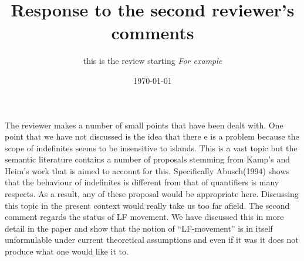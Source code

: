 \documentclass[11pt]{article}
\begin{document}
\title{Response to the second reviewer's comments}
\author{this is the review starting \textit{For example}}
\date{\today}

\maketitle
  The reviewer makes a number of small points that have been dealt with.  One point that we have not discussed is the idea that there e is a problem because the scope of indefinites seems to be insensitive to islands.  This is a vast topic but the semantic literature contains a number of proposals stemming from Kamp's and Heim's work that is aimed to account for this.  Specifically Abusch(1994) shows that the behaviour of indefinites is different from that of quantifiers is many respects.  As a result, any of these proposal would be appropriate here.  Discussing this topic in the present context would really take us too far afield.
The second comment regards the status of LF movement.  We have discussed this in more detail in the paper and show that the notion of ``LF-movement'' is in itself unformulable under current theoretical assumptions and even if it was it does not produce what one would like it to.
\end{document}
